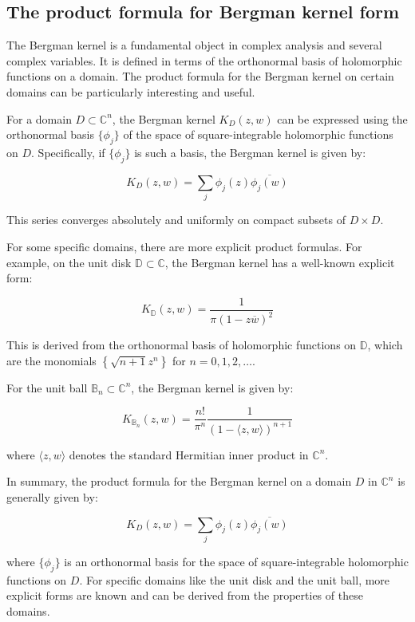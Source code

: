 \documentclass[lang=en,12pt]{beautybook}
\begin{document}
\subsection{The product formula for Bergman kernel form}
The Bergman kernel is a fundamental object in complex analysis and several complex variables. It is defined in terms of the orthonormal basis of holomorphic functions on a domain. The product formula for the Bergman kernel on certain domains can be particularly interesting and useful.

For a domain \( D \subset \mathbb{C}^n \), the Bergman kernel \( K_D(z, w) \) can be expressed using the orthonormal basis \( \{\phi_j\} \) of the space of square-integrable holomorphic functions on \( D \). Specifically, if \( \{\phi_j\} \) is such a basis, the Bergman kernel is given by:

\[ K_D(z, w) = \sum_{j} \phi_j(z) \overline{\phi_j(w)} \]

This series converges absolutely and uniformly on compact subsets of \( D \times D \).

For some specific domains, there are more explicit product formulas. For example, on the unit disk \( \mathbb{D} \subset \mathbb{C} \), the Bergman kernel has a well-known explicit form:

\[ K_{\mathbb{D}}(z, w) = \frac{1}{\pi (1 - z\overline{w})^2} \]

This is derived from the orthonormal basis of holomorphic functions on \( \mathbb{D} \), which are the monomials \( \left\{ \sqrt{n+1} z^n \right\} \) for \( n = 0, 1, 2, \ldots \).

For the unit ball \( \mathbb{B}_n \subset \mathbb{C}^n \), the Bergman kernel is given by:

\[ K_{\mathbb{B}_n}(z, w) = \frac{n!}{\pi^n} \frac{1}{(1 - \langle z, w \rangle)^{n+1}} \]

where \( \langle z, w \rangle \) denotes the standard Hermitian inner product in \( \mathbb{C}^n \).

In summary, the product formula for the Bergman kernel on a domain \( D \) in \( \mathbb{C}^n \) is generally given by:

\[ K_D(z, w) = \sum_{j} \phi_j(z) \overline{\phi_j(w)} \]

where \( \{\phi_j\} \) is an orthonormal basis for the space of square-integrable holomorphic functions on \( D \). For specific domains like the unit disk and the unit ball, more explicit forms are known and can be derived from the properties of these domains.
\end{document}
